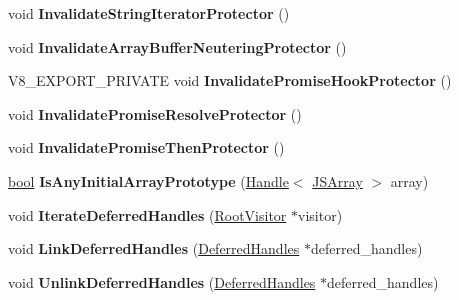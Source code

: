 \begin{DoxyCompactItemize}
void {\bfseries Invalidate\+String\+Iterator\+Protector} ()
\item 
\mbox{\label{classv8_1_1internal_1_1Isolate_a0a8cef670c413ff0c95326d7c9e39fa9}} 
void {\bfseries Invalidate\+Array\+Buffer\+Neutering\+Protector} ()
\item 
\mbox{\label{classv8_1_1internal_1_1Isolate_aba8da5aeb51e41d379e44631f8aba65a}} 
V8\+\_\+\+E\+X\+P\+O\+R\+T\+\_\+\+P\+R\+I\+V\+A\+TE void {\bfseries Invalidate\+Promise\+Hook\+Protector} ()
\item 
\mbox{\label{classv8_1_1internal_1_1Isolate_a76ead34791482bb4b9417bd1e885230c}} 
void {\bfseries Invalidate\+Promise\+Resolve\+Protector} ()
\item 
\mbox{\label{classv8_1_1internal_1_1Isolate_aa7f85916d4f1ebc72afce800e75a353a}} 
void {\bfseries Invalidate\+Promise\+Then\+Protector} ()
\item 
\mbox{\label{classv8_1_1internal_1_1Isolate_abad340703cc7f9230f3b97c8fa2e93b1}} 
\mbox{\hyperlink{classbool}{bool}} {\bfseries Is\+Any\+Initial\+Array\+Prototype} (\mbox{\hyperlink{classv8_1_1internal_1_1Handle}{Handle}}$<$ \mbox{\hyperlink{classv8_1_1internal_1_1JSArray}{J\+S\+Array}} $>$ array)
\item 
\mbox{\label{classv8_1_1internal_1_1Isolate_ae946d015c0e459a38eae4f15fee20fb1}} 
void {\bfseries Iterate\+Deferred\+Handles} (\mbox{\hyperlink{classv8_1_1internal_1_1RootVisitor}{Root\+Visitor}} $\ast$visitor)
\item 
\mbox{\label{classv8_1_1internal_1_1Isolate_ad40a0a2361ce9d4f44de9fbf9b7c9130}} 
void {\bfseries Link\+Deferred\+Handles} (\mbox{\hyperlink{classv8_1_1internal_1_1DeferredHandles}{Deferred\+Handles}} $\ast$deferred\+\_\+handles)
\item 
\mbox{\label{classv8_1_1internal_1_1Isolate_a07a4e40eb803a30794e372aca7f0ff11}} 
void {\bfseries Unlink\+Deferred\+Handles} (\mbox{\hyperlink{classv8_1_1internal_1_1DeferredHandles}{Deferred\+Handles}} $\ast$deferred\+\_\+handles)

\end{DoxyCompactItemize}
